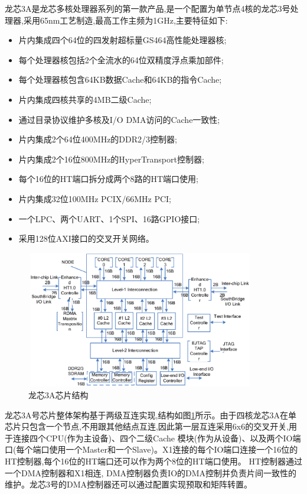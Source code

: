 
龙芯3A是龙芯多核处理器系列的第一款产品,是一个配置为单节点4核的龙芯3号处理器,采用65nm工艺制造,最高工作主频为1GHz,主要特征如下:

\begin{itemize}
\item{}片内集成四个64位的四发射超标量GS464高性能处理器核;
\item{}每个处理器核包括2个全流水的64位双精度浮点乘加部件;
\item{}每个处理器核包含64KB数据Cache和64KB的指令Cache;
\item{}片内集成四核共享的4MB二级Cache;
\item{}通过目录协议维护多核及I/O DMA访问的Cache一致性;
\item{}片内集成2个64位400MHz的DDR2/3控制器;
\item{}片内集成2个16位800MHz的HyperTransport控制器;
\item{}每个16位的HT端口拆分成两个8路的HT端口使用;
\item{}片内集成32位100MHz PCIX/66MHz PCI;
\item{}一个LPC、两个UART、1个SPI、16路GPIO接口;
\item{}采用128位AXI接口的交叉开关网络。
\end{itemize}

\begin{figure}[H] 
  \centering
  \includegraphics[width=10cm,height=6cm]{figures/chap01/Loongson3A}
  \caption{龙芯3A芯片结构}
  \label{fig:loongson3a}
\end{figure}

龙芯3A号芯片整体架构基于两级互连实现,结构如图\ref{fig:loongson3a}所示。由于四核龙芯3A在单芯片只包含一个节点,不用跟其他结点互连,因此第一层互连采用6x6的交叉开关,用于连接四个CPU(作为主设备)、四个二级Cache 模块(作为从设备)、以及两个IO端口(每个端口使用一个Master和一个Slave)。X1连接的每个IO端口连接一个16位的HT控制器,每个16位的HT端口还可以作为两个8位的HT端口使用。 HT控制器通过一个DMA控制器和X1相连, DMA控制器负责IO的DMA控制并负责片间一致性的维护。龙芯3号的DMA控制器还可以通过配置实现预取和矩阵转置\cite{Loongson3A-Manual}。
